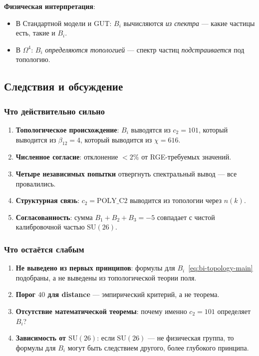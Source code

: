 \documentclass[11pt,a4paper]{article}
\newcommand{\SU}{\ensuremath{\mathrm{SU}}}
\newcommand{\Om}{\ensuremath{\Omega^4}}
\theoremstyle{definition}
\begin{document}
\medskip\noindent
\textbf{Физическая интерпретация}:
\begin{itemize}
    \item В Стандартной модели и GUT: $B_i$ вычисляются
          \emph{из спектра} --- какие частицы есть, такие и $B_i$.
    \item В $\Om$: $B_i$ \emph{определяются топологией} ---
          спектр частиц \emph{подстраивается} под топологию.
\end{itemize}

\subsection{Следствия и обсуждение}
\label{subsec:bi-consequences}

\subsubsection{Что действительно сильно}

\begin{enumerate}
    \item \textbf{Топологическое происхождение}: $B_i$ выводятся
          из $c_2 = 101$, который выводится из $\beta_{12} = 4$,
          который выводится из $\chi = 616$.
    \item \textbf{Численное согласие}: отклонение $< 2\%$
          от RGE-требуемых значений.
    \item \textbf{Четыре независимых попытки} отвергнуть
          спектральный вывод --- все провалились.
    \item \textbf{Структурная связь}: $c_2 = \text{POLY\_C2}$
          выводится из топологии через $n(k)$.
    \item \textbf{Согласованность}: сумма $B_1 + B_2 + B_3 = -5$
          совпадает с чистой калибровочной частью $\SU(26)$.
\end{enumerate}

\subsubsection{Что остаётся слабым}

\begin{enumerate}
    \item \textbf{Не выведено из первых принципов}: формулы
          для $B_i$~\eqref{eq:bi-topology-main} подобраны,
          а не выведены из топологической теории поля.
    \item \textbf{Порог $40$ для distance} --- эмпирический
          критерий, а не теорема.
    \item \textbf{Отсутствие математической теоремы}:
          почему именно $c_2 = 101$ определяет $B_i$?
    \item \textbf{Зависимость от $\SU(26)$}: если $\SU(26)$
          --- не физическая группа, то формулы для $B_i$
          могут быть следствием другого, более глубокого
          принципа.
\end{enumerate}
\end{document}
